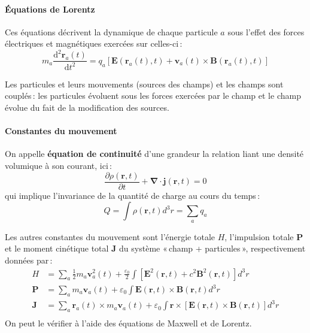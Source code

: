         \paragraph{Équations de Lorentz}

        Ces équations décrivent la dynamique de chaque particule $a$ sous l’effet des forces électriques et magnétiques exercées sur celles-ci :
        \[ m_a \frac{\text{d}^2\mathbf{r}_a(t)}{\text{d}t^2} = q_a \left[\mathbf{E}(\mathbf{r}_a(t), t) + \mathbf{v}_a(t) \times \mathbf{B}(\mathbf{r}_a(t), t)\right] \]

        Les particules et leurs mouvements (sources des champs) et les champs sont couplés : les particules évoluent sous les forces exercées par le champ et le champ évolue du fait de la modification des sources.

        \paragraph{Constantes du mouvement}

        On appelle \textbf{équation de continuité} d’une grandeur la relation liant une densité volumique à son courant, ici :
        \[ \frac{\partial \rho(\mathbf{r},t)}{\partial t}  + \symbf{\nabla} \cdot \mathbf{j} (\mathbf{r}, t) = 0 \]
        qui implique l’invariance de la quantité de charge au cours du temps :
        \[ Q = \int \rho(\mathbf{r}, t) d^3r = \sum_a q_a \]   

        Les autres constantes du mouvement sont l’énergie totale $H$, l’impulsion totale $\mathbf{P}$ et le moment cinétique total $\mathbf{J}$ du système « champ + particules », respectivement données par :
        \begin{align*}
            H &= \sum_{a} \frac{1}{2} m_a \mathbf{v}_a^2(t) + \frac{\varepsilon_0}{2} \int \left[\mathbf{E}^2(\mathbf{r}, t) + c^2 \mathbf{B}^2(\mathbf{r}, t)\right] d^3 r \\
            \mathbf{P} &= \sum_a m_a \mathbf{v}_a(t) + \varepsilon_0 \int \mathbf{E}(\mathbf{r}, t) \times \mathbf{B}(\mathbf{r}, t) d^3 r \\
            \mathbf{J} &= \sum_a \mathbf{r}_a(t) \times m_a \mathbf{v}_a(t) + \varepsilon_0 \int \mathbf{r} \times \left[\mathbf{E}(\mathbf{r}, t) \times \mathbf{B}(\mathbf{r}, t)\right] d^3r \\
        \end{align*}
        On peut le vérifier à l’aide des équations de Maxwell et de Lorentz.

